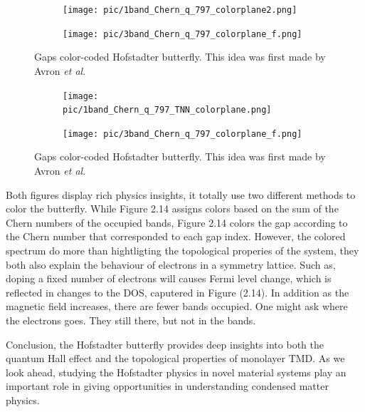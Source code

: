 \documentclass{report}
\begin{document}
\begin{figure}[htb]
	\centering
	\begin{subfigure}[b]{0.495\textwidth}
		\centering
		{\texttt{[image: pic/1band\_Chern\_q\_797\_colorplane2.png]}}
	\end{subfigure}
	\begin{subfigure}[b]{0.495\textwidth}
		\centering
		\texttt{[image: pic/3band\_Chern\_q\_797\_colorplane\_f.png]}
	\end{subfigure}
	\caption[Gaps color-coded Hofstadter butterfly for NN case.]{
		Gaps color-coded Hofstadter butterfly. This idea was first made by Avron \textit{et al}\cite{avron2003}.
	}
\end{figure}
\begin{figure}[htb]
	\centering
	\begin{subfigure}[b]{0.495\textwidth}
		\centering
		{\texttt{[image: pic/1band\_Chern\_q\_797\_TNN\_colorplane.png]}}
	\end{subfigure}
	\begin{subfigure}[b]{0.495\textwidth}
		\centering
		\texttt{[image: pic/3band\_Chern\_q\_797\_colorplane\_f.png]}
	\end{subfigure}
	\caption[Gaps color-coded Hofstadter butterfly for TNN case.]{
		Gaps color-coded Hofstadter butterfly. This idea was first made by Avron \textit{et al}\cite{avron2003}.
	}
\end{figure}

Both figures display rich physics insights, it totally use two different methods to color the butterfly. While Figure 2.14 assigns colors based on the sum of the Chern numbers of the occupied bands, Figure 2.14 colors the gap according to the Chern number that corresponded to each gap index. However, the colored spectrum do more than hightligting the topological properies of the system, they both also explain the behaviour of electrons in a symmetry lattice. Such as, doping a fixed number of electrons will causes Fermi level change, which is reflected in changes to the \ac{DOS}, caputered in Figure (2.14). In addition as the magnetic field increases, there are fewer bands occupied. One might ask where the electrons goes. They still there, but not in the bands.


Conclusion, the Hofstadter butterfly provides deep insights into both the quantum Hall effect and the topological properties of monolayer \ac{TMD}. As we look ahead, studying the Hofstadter physics in novel material systems play an important role in giving opportunities in understanding condensed matter physics.
\end{document}

